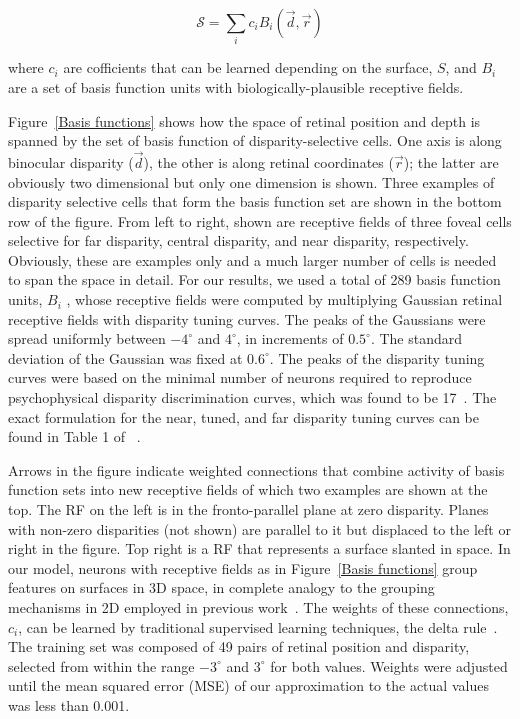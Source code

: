 \begin{equation}
\mathcal{S} = \sum_{i}c_{i}B_{i}(\vec{d}, \vec{r})
\end{equation}

\noindent where $c_{i}$ are cofficients that can be learned depending on the surface, $S$, and $B_{i}$ are a set of basis function units with biologically-plausible receptive fields.

Figure~\ref{Basis functions}
%
%
shows how the space of retinal position and depth is spanned by the set of basis function of disparity-selective cells. One axis is along binocular disparity ($\vec{d}$), the other is along retinal coordinates ($\vec{r}$); the latter are obviously two dimensional but only one dimension is shown. Three examples of disparity selective cells that form the basis function set are shown in the bottom row of the figure. From left to right, shown are receptive fields of three foveal cells selective for far disparity, central disparity, and near disparity, respectively. Obviously, these are examples only and a much larger number of cells is needed to span the space in detail. For our results, we used a total of 289 basis function units, $B_{i}$ , whose receptive fields were computed by multiplying Gaussian retinal receptive fields with disparity tuning curves. The peaks of the Gaussians were spread uniformly between $-4^{\circ}$ and $4^{\circ}$, in increments of $0.5^{\circ}$. The standard deviation of the Gaussian was fixed at $0.6^{\circ}$. The peaks of the disparity tuning curves were based on the minimal number of neurons required to reproduce psychophysical disparity discrimination curves, which was found to be 17~\citep{Lehky_Sejnowski90}. The exact formulation for the near, tuned, and far disparity tuning curves can be found in Table 1 of ~\citep{Lehky_Sejnowski90}.

Arrows in the figure indicate weighted connections that combine activity of basis function sets into new receptive fields of which two examples are shown at the top. The RF on the left is in the fronto-parallel plane at zero disparity. Planes with non-zero disparities (not shown) are parallel to it but displaced to the left or right in the figure. Top right is a RF that represents a surface slanted in space. In our model, neurons with receptive fields as in Figure~\ref{Basis functions} group features on surfaces in 3D space, in complete analogy to the grouping mechanisms in 2D employed in previous work~\citep{Craft_etal07,Mihalas_etal11b}. The weights of these connections, $c_{i}$, can be learned by traditional supervised learning techniques, \eg the delta rule~\citep{Widrow_Hoff60}. The training set was composed of 49 pairs of retinal position and disparity, selected from within the range $-3^\circ{}$ and $3^\circ{}$ for both values. Weights were adjusted until the mean squared error (MSE) of our approximation to the actual values was less than 0.001.


